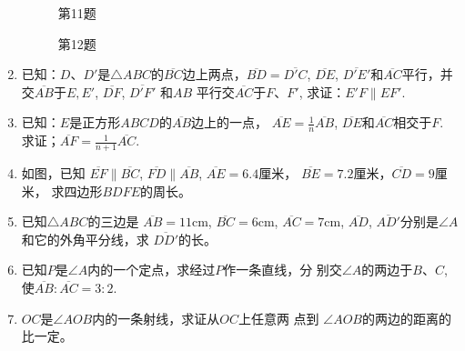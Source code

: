 \begin{enumerate}
\begin{figure}[htp]\centering
    \begin{minipage}[t]{0.48\textwidth}
    \centering
{}
    \caption*{第11题}
    \end{minipage}
    \begin{minipage}[t]{0.48\textwidth}
    \centering
    \caption*{第12题}
    \end{minipage}
    \end{figure}

\item 已知：$D$、$D'$是$\triangle ABC$的$\overline{BC}$边上两点，$\overline{BD}=\overline{D'C}$, 
$\overline{DE}$, $\overline{D'E'}$和$\overline{AC}$平行，并交$\overline{AB}$于$E,E'$, $\overline{DF}$, $\overline{D'F'}$ 和$AB$
平行交$\overline{AC}$于$F$、$F'$, 求证：$E'F\parallel EF'$.
\item 已知：$E$是正方形$ABCD$的$\overline{AB}$边上的一点，
$\overline{AE}=\frac{1}{n}\overline{AB}$, $\overline{DE}$和$\overline{AC}$相交于$F$. 求证；$\overline{AF}=\frac{1}{n+1}\overline{AC}$.
\item 如图，已知
$\overline{EF}\parallel \overline{BC}$, $\overline{FD}\parallel\overline{AB}$, $\overline{AE}=6.4$厘米，
$\overline{BE}=7.2$厘米，$\overline{CD}=9$厘米，
求四边形$BDFE$的周长。
\item 已知$\triangle ABC$的三边是
$\overline{AB}=11$cm, $\overline{BC}=6$cm,
$\overline{AC}=7$cm, $\overline{AD}$, $\overline{AD'}$分别是$\angle A$和它的外角平分线，求
$\overline{DD'}$的长。
\item 已知$P$是$\angle A$内的一个定点，求经过$P$作一条直线，分
别交$\angle A$的两边于$B$、$C$, 使$\overline{AB}:\overline{AC}=3:2$.
\item $OC$是$\angle AOB$内的一条射线，求证从$OC$上任意两 点到
$\angle AOB$的两边的距离的比一定。


\end{enumerate}
